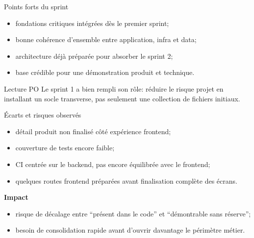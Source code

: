 \documentclass[10pt,aspectratio=169]{beamer}
\begin{document}
\begin{frame}{Points forts du sprint}
  \begin{itemize}
    \item fondations critiques intégrées dès le premier sprint;
    \item bonne cohérence d'ensemble entre application, infra et data;
    \item architecture déjà préparée pour absorber le sprint 2;
    \item base crédible pour une démonstration produit et technique.
  \end{itemize}

  \vspace{0.3cm}

  \begin{block}{Lecture PO}
    Le sprint 1 a bien rempli son rôle: réduire le risque projet en installant un socle transverse, pas seulement une collection de fichiers initiaux.
  \end{block}
\end{frame}

\begin{frame}{Écarts et risques observés}
  \begin{itemize}
    \item détail produit non finalisé côté expérience frontend;
    \item couverture de tests encore faible;
    \item CI centrée sur le backend, pas encore équilibrée avec le frontend;
    \item quelques routes frontend préparées avant finalisation complète des écrans.
  \end{itemize}

  \vspace{0.3cm}

  \textbf{Impact}
  \begin{itemize}
    \item risque de décalage entre “présent dans le code” et “démontrable sans réserve”;
    \item besoin de consolidation rapide avant d'ouvrir davantage le périmètre métier.
  \end{itemize}
\end{frame}
\end{document}

